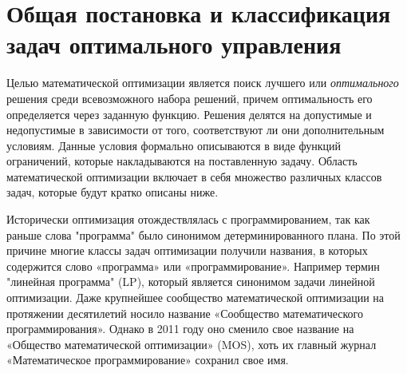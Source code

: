  
\section{Общая постановка и классификация задач оптимального управления}\label{1sec:optimal-control-tasks}


Целью математической оптимизации является поиск лучшего или {\it оптимального} решения среди всевозможного набора решений, причем оптимальность его определяется через заданную функцию. Решения делятся на допустимые и недопустимые в зависимости от того, соответствуют ли они дополнительным условиям. Данные условия формально описываются в виде функций ограничений, которые накладываются на поставленную задачу. Область математической оптимизации включает в себя множество различных классов задач, которые будут кратко описаны ниже.

Исторически оптимизация отождествлялась с программированием, так как раньше слова "программа" было синонимом детерминированного плана. По этой причине многие классы задач оптимизации получили названия, в которых содержится слово «программа» или «программирование». Например термин "линейная программа" (LP), который является синонимом задачи линейной оптимизации. Даже крупнейшее сообщество математической оптимизации на протяжении десятилетий носило название «Сообщество математического программирования». Однако в 2011 году оно сменило свое название на «Общество математической оптимизации» (MOS), хоть их главный журнал «Математическое программирование» сохранил свое имя. 

